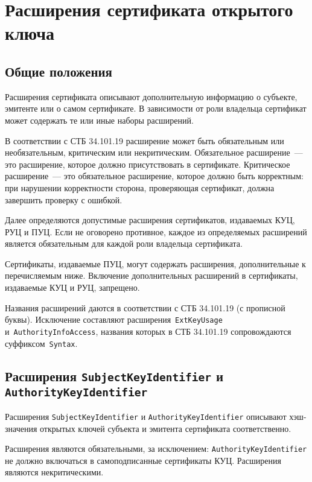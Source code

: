 \section{Расширения сертификата открытого ключа}\label{FMT.Ext}

\subsection{Общие положения}\label{FMT.Ext.Intro} 

Расширения сертификата описывают дополнительную информацию о субъекте,
эмитенте или о самом сертификате. В зависимости от роли владельца 
сертификат может содержать те или иные наборы расширений.

В соответствии с СТБ 34.101.19 расширение может быть обязательным или 
необязательным, критическим или некритическим. 
Обязательное расширение~--- это расширение, которое должно присутствовать 
в сертификате.  Критическое расширение~--- это обязательное  
расширение, которое должно быть корректным: при нарушении корректности
сторона, проверяющая сертификат, должна завершить проверку с ошибкой.

Далее определяются допустимые расширения сертификатов, издаваемых КУЦ, РУЦ и ПУЦ. 
Если не оговорено противное, каждое из определяемых расширений является 
обязательным для каждой роли владельца сертификата. 

Сертификаты, издаваемые ПУЦ, могут содержать расширения, 
дополнительные к перечисляемым ниже. Включение дополнительных расширений в 
сертификаты, издаваемые КУЦ и РУЦ, запрещено.

Названия расширений даются в соответствии с СТБ 34.101.19
(с прописной буквы). Исключение составляют расширения~\texttt{ExtKeyUsage} 
и~\texttt{AuthorityInfoAccess}, названия которых в СТБ 34.101.19 
сопровождаются суффиксом~\texttt{Syntax}.

\subsection{Расширения \texttt{SubjectKeyIdentifier} и 
\texttt{AuthorityKeyIdentifier}}\label{FMT.Ext.SKID} 

Расширения \texttt{SubjectKeyIdentifier} и \texttt{AuthorityKeyIdentifier} 
описывают хэш-значения открытых ключей субъекта и эмитента сертификата 
соответственно. 

Расширения являются обязательными, за исключением:
\texttt{AuthorityKeyIdentifier} не должно включаться в самоподписанные 
сертификаты КУЦ. Расширения являются некритическими. 
 
